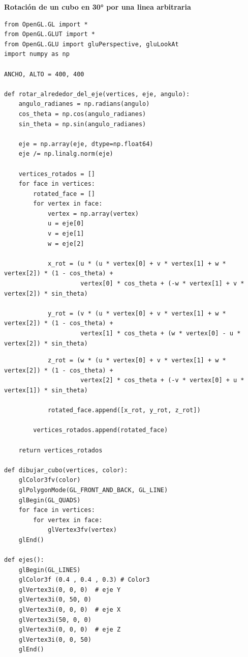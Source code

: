 \documentclass[a4paper]{article}
\begin{document}
\newpage
\Large{\textbf{Rotación de un cubo en 30° por una linea arbitraria}}\\[-0.4cm]
\begin{center}
\begin{mycodeboxl}
\begin{lstlisting}
from OpenGL.GL import *
from OpenGL.GLUT import *
from OpenGL.GLU import gluPerspective, gluLookAt
import numpy as np

ANCHO, ALTO = 400, 400

def rotar_alrededor_del_eje(vertices, eje, angulo):
    angulo_radianes = np.radians(angulo)
    cos_theta = np.cos(angulo_radianes)
    sin_theta = np.sin(angulo_radianes)

    eje = np.array(eje, dtype=np.float64)
    eje /= np.linalg.norm(eje)

    vertices_rotados = []
    for face in vertices:
        rotated_face = []
        for vertex in face:
            vertex = np.array(vertex)
            u = eje[0]
            v = eje[1]
            w = eje[2]
            
            x_rot = (u * (u * vertex[0] + v * vertex[1] + w * vertex[2]) * (1 - cos_theta) +
                     vertex[0] * cos_theta + (-w * vertex[1] + v * vertex[2]) * sin_theta)
            
            y_rot = (v * (u * vertex[0] + v * vertex[1] + w * vertex[2]) * (1 - cos_theta) +
                     vertex[1] * cos_theta + (w * vertex[0] - u * vertex[2]) * sin_theta)
\end{lstlisting}
\end{mycodeboxl}
\end{center}
\begin{center}
\begin{mycodeboxl}
\begin{lstlisting}
            z_rot = (w * (u * vertex[0] + v * vertex[1] + w * vertex[2]) * (1 - cos_theta) +
                     vertex[2] * cos_theta + (-v * vertex[0] + u * vertex[1]) * sin_theta)
            
            rotated_face.append([x_rot, y_rot, z_rot])

        vertices_rotados.append(rotated_face)

    return vertices_rotados

def dibujar_cubo(vertices, color):
    glColor3fv(color)
    glPolygonMode(GL_FRONT_AND_BACK, GL_LINE)
    glBegin(GL_QUADS)
    for face in vertices:
        for vertex in face:
            glVertex3fv(vertex)
    glEnd()

def ejes():
    glBegin(GL_LINES)
    glColor3f (0.4 , 0.4 , 0.3) # Color3
    glVertex3i(0, 0, 0)  # eje Y
    glVertex3i(0, 50, 0)
    glVertex3i(0, 0, 0)  # eje X
    glVertex3i(50, 0, 0)
    glVertex3i(0, 0, 0)  # eje Z
    glVertex3i(0, 0, 50)
    glEnd()
\end{lstlisting}
\end{mycodeboxl}
\end{center}
\end{document}
